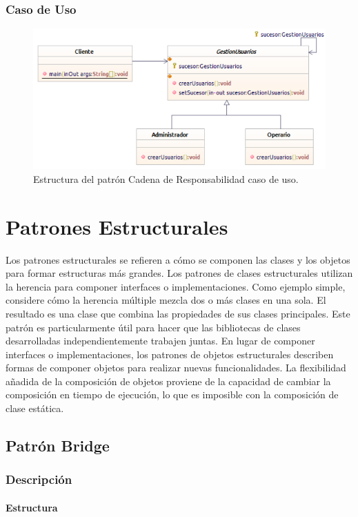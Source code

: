 \subsubsection{Caso de Uso}
\begin{figure}[th!]
	\centering
	\includegraphics[width=.7\linewidth]{imagenes/Patrones/Cadena_caso.pdf}
	\caption{Estructura del patrón Cadena de Responsabilidad caso de uso.\cite{gof}}	
\end{figure}

\section{Patrones Estructurales}
Los patrones estructurales se refieren a cómo se componen las clases y los objetos para formar estructuras más grandes. Los patrones de clases estructurales utilizan la herencia para componer interfaces o implementaciones. Como ejemplo simple, considere cómo la herencia múltiple mezcla dos o más clases en una sola. El resultado es una clase que combina las propiedades de sus clases principales. Este patrón es particularmente útil para hacer que las bibliotecas de clases desarrolladas independientemente trabajen juntas. En lugar de componer interfaces o implementaciones, los patrones de objetos estructurales describen formas de componer objetos para realizar nuevas funcionalidades. La flexibilidad añadida de la composición de objetos proviene de la capacidad de cambiar la composición en tiempo de ejecución, lo que es imposible con la composición de clase estática.\cite{gof}
\subsection{Patrón Bridge}

\subsubsection{Descripción}

\paragraph{Estructura}

